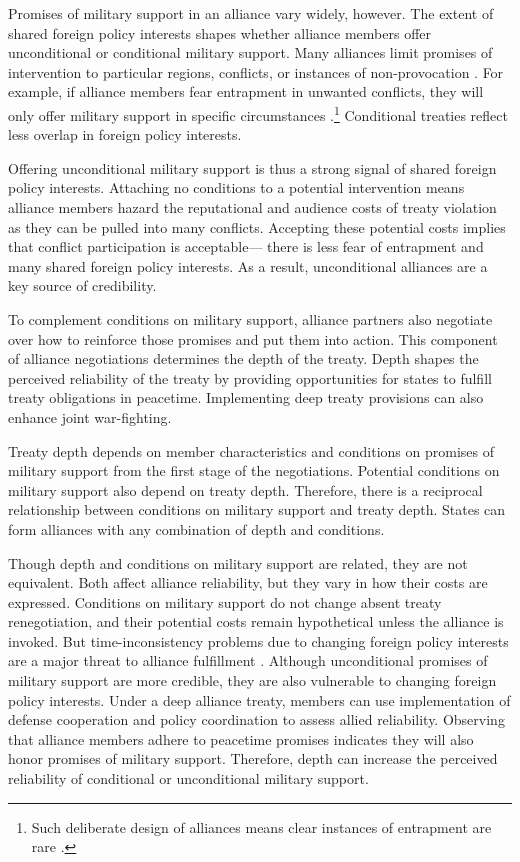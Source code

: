 \documentclass[12pt]{article}
\begin{document}
Promises of military support in an alliance vary widely, however. 
The extent of shared foreign policy interests shapes whether alliance members offer unconditional or conditional military support.
Many alliances limit promises of intervention to particular regions, conflicts, or instances of non-provocation \citep{Leedsetal2000}. 
For example, if alliance members fear entrapment in unwanted conflicts, they will only offer military support in specific circumstances \citep{Kim2011, Benson2012}.\footnote{Such deliberate design of alliances means clear instances of entrapment are rare \citep{Kim2011, Beckley2015}.} 
Conditional treaties reflect less overlap in foreign policy interests. 


Offering unconditional military support is thus a strong signal of shared foreign policy interests. 
Attaching no conditions to a potential intervention means alliance members hazard the reputational \citep{Gibler2008, Crescenzietal2012} and audience \citep{Fearon1997} costs of treaty violation as they can be pulled into many conflicts. 
Accepting these potential costs implies that conflict participation is acceptable--- there is less fear of entrapment and many shared foreign policy interests. 
As a result, unconditional alliances are a key source of credibility. 


To complement conditions on military support, alliance partners also negotiate over how to reinforce those promises and put them into action. 
This component of alliance negotiations determines the depth of the treaty. 
Depth shapes the perceived reliability of the treaty by providing opportunities for states to fulfill treaty obligations in peacetime. 
Implementing deep treaty provisions can also enhance joint war-fighting. 


Treaty depth depends on member characteristics and conditions on promises of military support from the first stage of the negotiations.
Potential conditions on military support also depend on treaty depth. 
Therefore, there is a reciprocal relationship between conditions on military support and treaty depth. 
States can form alliances with any combination of depth and conditions. 


Though depth and conditions on military support are related, they are not equivalent. 
Both affect alliance reliability, but they vary in how their costs are expressed. 
Conditions on military support do not change absent treaty renegotiation, and their potential costs remain hypothetical unless the alliance is invoked.  
But time-inconsistency problems due to changing foreign policy interests are a major threat to alliance fulfillment \citep{LeedsSavun2007}. 
Although unconditional promises of military support are more credible, they are also vulnerable to changing foreign policy interests. 
Under a deep alliance treaty, members can use implementation of defense cooperation and policy coordination to assess allied reliability. 
Observing that alliance members adhere to peacetime promises indicates they will also honor promises of military support. 
Therefore, depth can increase the perceived reliability of conditional or unconditional military support. 
\end{document}
